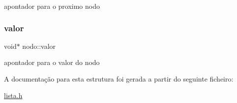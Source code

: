 apontador para o proximo nodo \mbox{\label{structnodo_ab63adcdb83ea1fdcf4fa10f3cafc4a6a}} 
\subsubsection{\texorpdfstring{valor}{valor}}
{\footnotesize\ttfamily void$\ast$ nodo\+::valor}

apontador para o valor do nodo 

A documentação para esta estrutura foi gerada a partir do seguinte ficheiro\+:\begin{DoxyCompactItemize}
\item 
\hyperlink{lista_8h}{lista.\+h}\end{DoxyCompactItemize}
